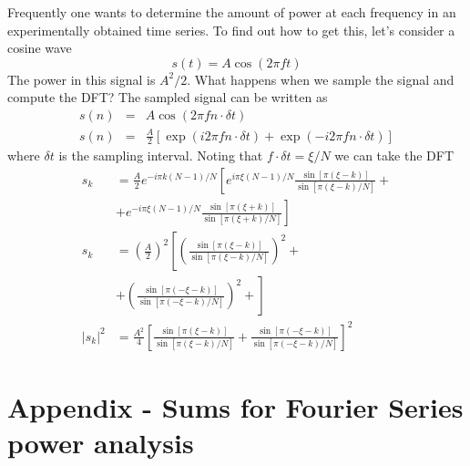 Frequently one wants to determine the amount of power at each frequency
in an experimentally obtained time series. To find out how to get
this, let's consider a cosine wave\[
s(t)=A\cos\left(2\pi ft\right)\]
 The power in this signal is $A^{2}/2$. What happens when we sample
the signal and compute the DFT? The sampled signal can be written
as\begin{eqnarray*}
s(n) & = & A\cos\left(2\pi fn\cdot\delta t\right)\\
s(n) & = & \frac{A}{2}\left[\exp\left(i2\pi fn\cdot\delta t\right)+\exp\left(-i2\pi fn\cdot\delta t\right)\right]\end{eqnarray*}
 where $\delta t$ is the sampling interval. Noting that $f\cdot\delta t=\xi/N$
we can take the DFT\begin{align*}
s_{k} & = \frac{A}{2}e^{-i\pi k(N-1)/N}\left[e^{i\pi\xi(N-1)/N}\frac{\sin\left[\pi\left(\xi-k\right)\right]}{\sin\left[\pi\left(\xi-k\right)/N\right]}+\right.\\
 & + \left.e^{-i\pi\xi(N-1)/N}\frac{\sin\left[\pi\left(\xi+k\right)\right]}{\sin\left[\pi\left(\xi+k\right)/N\right]}\right]\\
s_{k} & = \left(\frac{A}{2}\right)^{2}\left[\left(\frac{\sin\left[\pi\left(\xi-k\right)\right]}{\sin\left[\pi\left(\xi-k\right)/N\right]}\right)^{2}+\right.\\
 & + \left.\left(\frac{\sin\left[\pi\left(-\xi-k\right)\right]}{\sin\left[\pi\left(-\xi-k\right)/N\right]}\right)^{2}+\right]\\
|s_{k}|^{2} & = \frac{A^{2}}{4}\left[\frac{\sin\left[\pi\left(\xi-k\right)\right]}{\sin\left[\pi\left(\xi-k\right)/N\right]}+\frac{\sin\left[\pi\left(-\xi-k\right)\right]}{\sin\left[\pi\left(-\xi-k\right)/N\right]}\right]^{2}
\end{align*}



\section{Appendix - Sums for Fourier Series power analysis}

